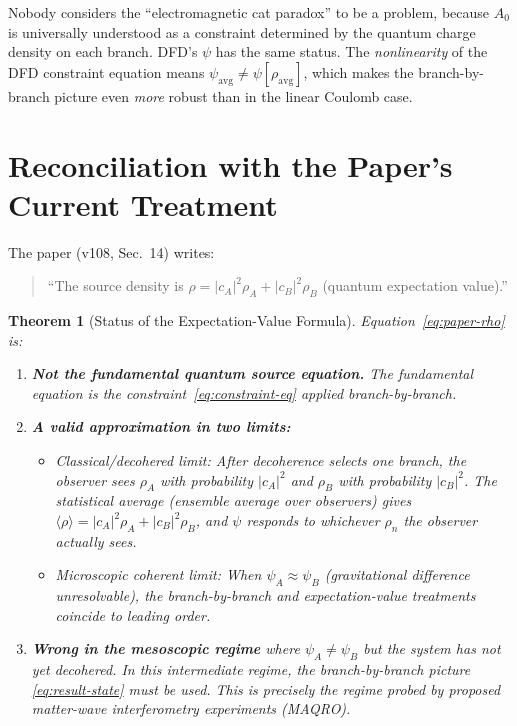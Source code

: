\documentclass[11pt,a4paper]{article}
\newtheorem{theorem}{Theorem}[section]
\begin{document}
Nobody considers the ``electromagnetic cat paradox'' to be a problem,
because $A_0$ is universally understood as a constraint determined by
the quantum charge density on each branch. DFD's $\psi$ has the same
status. The \emph{nonlinearity} of the DFD constraint equation means
$\psi_\mathrm{avg} \neq \psi[\rho_\mathrm{avg}]$, which makes the
branch-by-branch picture even \emph{more} robust than in the linear
Coulomb case.

\section{Reconciliation with the Paper's Current Treatment}
\label{sec:reconciliation}

The paper (v108, Sec.~14) writes:
\begin{quote}
``The source density is $\rho = |c_A|^2\rho_A + |c_B|^2\rho_B$
(quantum expectation value).''
\end{quote}

\begin{theorem}[Status of the Expectation-Value Formula]
\label{thm:reconciliation}
Equation~\eqref{eq:paper-rho} is:
\begin{enumerate}
\item[(a)] \textbf{Not the fundamental quantum source equation.} The
fundamental equation is the constraint~\eqref{eq:constraint-eq} applied
branch-by-branch.

\item[(b)] \textbf{A valid approximation in two limits:}
\begin{itemize}
\item \emph{Classical/decohered limit}: After decoherence selects one
branch, the observer sees $\rho_A$ with probability $|c_A|^2$ and
$\rho_B$ with probability $|c_B|^2$. The \emph{statistical} average
(ensemble average over observers) gives $\langle\rho\rangle
= |c_A|^2\rho_A + |c_B|^2\rho_B$, and $\psi$ responds to whichever
$\rho_n$ the observer actually sees.

\item \emph{Microscopic coherent limit}: When $\psi_A \approx \psi_B$
(gravitational difference unresolvable), the branch-by-branch and
expectation-value treatments coincide to leading order.
\end{itemize}

\item[(c)] \textbf{Wrong in the mesoscopic regime} where
$\psi_A \neq \psi_B$ but the system has not yet decohered. In this
intermediate regime, the branch-by-branch picture
\eqref{eq:result-state} must be used. This is precisely the regime
probed by proposed matter-wave interferometry experiments (MAQRO).
\end{enumerate}
\end{theorem}
\end{document}
